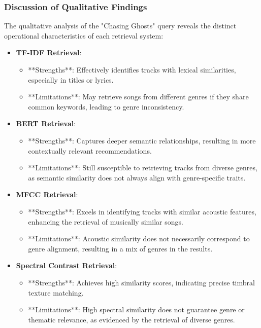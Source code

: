 \documentclass[sigconf]{acmart}
\begin{document}
\subsubsection{Discussion of Qualitative Findings}

The qualitative analysis of the "Chasing Ghosts" query reveals the distinct operational characteristics of each retrieval system:

\begin{itemize}
    \item \textbf{TF-IDF Retrieval}:
    \begin{itemize}
        \item **Strengths**: Effectively identifies tracks with lexical similarities, especially in titles or lyrics.
        \item **Limitations**: May retrieve songs from different genres if they share common keywords, leading to genre inconsistency.
    \end{itemize}
    
    \item \textbf{BERT Retrieval}:
    \begin{itemize}
        \item **Strengths**: Captures deeper semantic relationships, resulting in more contextually relevant recommendations.
        \item **Limitations**: Still susceptible to retrieving tracks from diverse genres, as semantic similarity does not always align with genre-specific traits.
    \end{itemize}
    
    \item \textbf{MFCC Retrieval}:
    \begin{itemize}
        \item **Strengths**: Excels in identifying tracks with similar acoustic features, enhancing the retrieval of musically similar songs.
        \item **Limitations**: Acoustic similarity does not necessarily correspond to genre alignment, resulting in a mix of genres in the results.
    \end{itemize}
    
    \item \textbf{Spectral Contrast Retrieval}:
    \begin{itemize}
        \item **Strengths**: Achieves high similarity scores, indicating precise timbral texture matching.
        \item **Limitations**: High spectral similarity does not guarantee genre or thematic relevance, as evidenced by the retrieval of diverse genres.
    \end{itemize}
    

\end{itemize}
\end{document}
